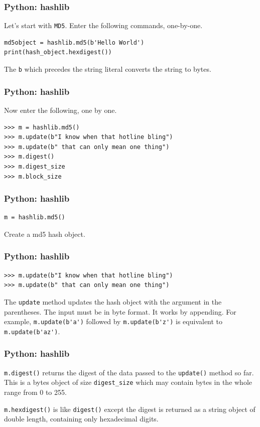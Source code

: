 \documentclass{beamer}
\newcommand{\<}{\langle}
\renewcommand{\>}{\rangle}
\begin{document}
\begin{frame}[fragile]
\frametitle{Python: hashlib}

Let's start with \verb|MD5|.  Enter the following commands, one-by-one.
\begin{verbatim}
md5object = hashlib.md5(b'Hello World')
print(hash_object.hexdigest())
\end{verbatim}

The \verb|b| which precedes the string literal converts the string to bytes.
\end{frame}


\begin{frame}[fragile]
\frametitle{Python: hashlib}

Now enter the following, one by one. 

\begin{verbatim}
>>> m = hashlib.md5()
>>> m.update(b"I know when that hotline bling")
>>> m.update(b" that can only mean one thing")
>>> m.digest()
>>> m.digest_size
>>> m.block_size
\end{verbatim}
\end{frame}


\begin{frame}[fragile]
\frametitle{Python: hashlib}

\begin{verbatim}
m = hashlib.md5()
\end{verbatim}

Create a md5 hash object. 
\end{frame}

\begin{frame}[fragile]
\frametitle{Python: hashlib}
\begin{verbatim}
>>> m.update(b"I know when that hotline bling")
>>> m.update(b" that can only mean one thing")
\end{verbatim}
The \verb|update| method updates the hash object with the argument in the parentheses. The input must be in byte format. It works by appending. For example, \verb|m.update(b'a')| followed by \verb|m.update(b'z')| is equivalent to \verb|m.update(b'az')|.
\end{frame}

\begin{frame}[fragile]
\frametitle{Python: hashlib}

\verb|m.digest()| returns the digest of the data passed to the \verb|update()| method so far. This is a bytes object of size \verb|digest_size| which may contain bytes in the whole range from 0 to 255.\newline

\verb|m.hexdigest()| is like \verb|digest()| except the digest is returned as a string object of double length, containing only hexadecimal digits. 
\end{frame}
\end{document}
